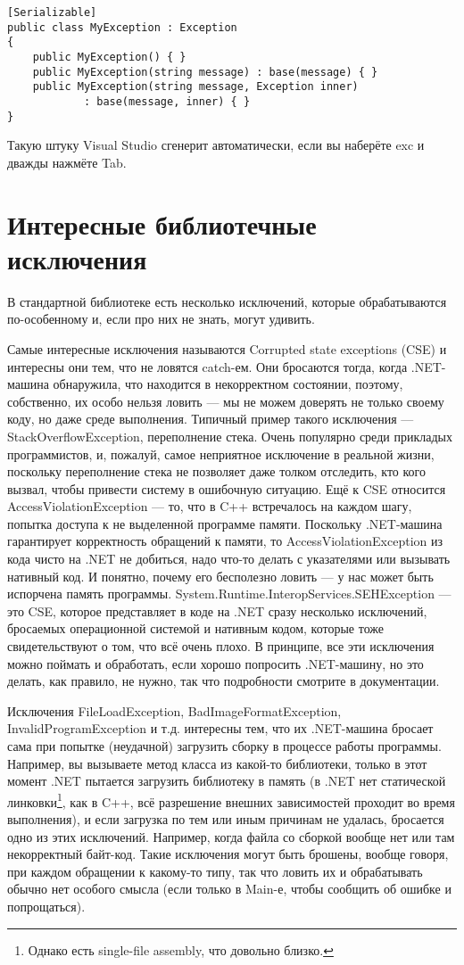 \documentclass{../../text-style}
\begin{document}
\begin{verbatim}
[Serializable]
public class MyException : Exception
{
    public MyException() { }
    public MyException(string message) : base(message) { }
    public MyException(string message, Exception inner) 
            : base(message, inner) { }
}
\end{verbatim}

Такую штуку Visual Studio сгенерит автоматически, если вы наберёте exc и дважды нажмёте Tab.

\section{Интересные библиотечные исключения}

В стандартной библиотеке есть несколько исключений, которые обрабатываются по-особенному и, если про них не знать, могут удивить. 

Самые интересные исключения называются Corrupted state exceptions (CSE) и интересны они тем, что не ловятся catch-ем. Они бросаются тогда, когда .NET-машина обнаружила, что находится в некорректном состоянии, поэтому, собственно, их особо нельзя ловить --- мы не можем доверять не только своему коду, но даже среде выполнения. Типичный пример такого исключения --- StackOverflowException, переполнение стека. Очень популярно среди прикладых программистов, и, пожалуй, самое неприятное исключение в реальной жизни, поскольку переполнение стека не позволяет даже толком отследить, кто кого вызвал, чтобы привести систему в ошибочную ситуацию. Ещё к CSE относится AccessViolationException --- то, что в C++ встречалось на каждом шагу, попытка доступа к не выделенной программе памяти. Поскольку .NET-машина гарантирует корректность обращений к памяти, то AccessViolationException из кода чисто на .NET не добиться, надо что-то делать с указателями или вызывать нативный код. И понятно, почему его бесполезно ловить --- у нас может быть испорчена память программы. System.Runtime.InteropServices.SEHException --- это CSE, которое представляет в коде на .NET сразу несколько исключений, бросаемых операционной системой и нативным кодом, которые тоже свидетельствуют о том, что всё очень плохо. В принципе, все эти исключения можно поймать и обработать, если хорошо попросить .NET-машину, но это делать, как правило, не нужно, так что подробности смотрите в документации.

Исключения FileLoadException, BadImageFormatException, InvalidProgramException и т.д. интересны тем, что их .NET-машина бросает сама при попытке (неудачной) загрузить сборку в процессе работы программы. Например, вы вызываете метод класса из какой-то библиотеки, только в этот момент .NET пытается загрузить библиотеку в память (в .NET нет статической линковки\footnote{Однако есть single-file assembly, что довольно близко.}, как в C++, всё разрешение внешних зависимостей проходит во время выполнения), и если загрузка по тем или иным причинам не удалась, бросается одно из этих исключений. Например, когда файла со сборкой вообще нет или там некорректный байт-код. Такие исключения могут быть брошены, вообще говоря, при каждом обращении к какому-то типу, так что ловить их и обрабатывать обычно нет особого смысла (если только в Main-е, чтобы сообщить об ошибке и попрощаться).
\end{document}

